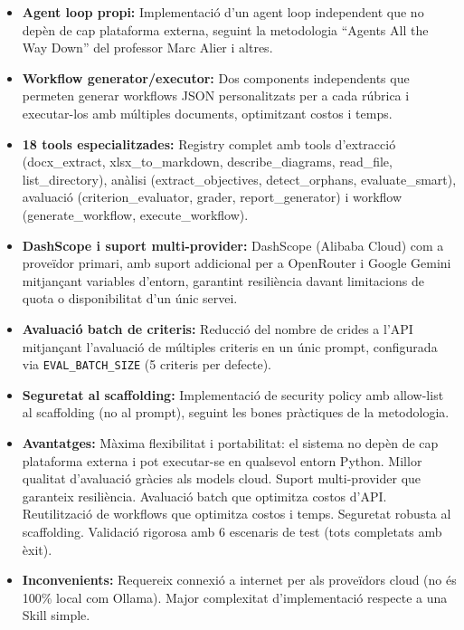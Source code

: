 \documentclass[12pt,a4paper,twoside]{report}
\begin{document}
\begin{itemize}
    \item \textbf{Agent loop propi:} Implementaci\'o d'un agent loop independent que no dep\`en de cap plataforma externa, seguint la metodologia ``Agents All the Way Down'' \cite{alier2025} del professor Marc Alier i altres.
    \item \textbf{Workflow generator/executor:} Dos components independents que permeten generar workflows JSON personalitzats per a cada r\'ubrica i executar-los amb m\'ultiples documents, optimitzant costos i temps.
    \item \textbf{18 tools especialitzades:} Registry complet amb tools d'extracci\'o (docx\_extract, xlsx\_to\_markdown, describe\_diagrams, read\_file, list\_directory), an\`alisi (extract\_objectives, detect\_orphans, evaluate\_smart), avaluaci\'o (criterion\_evaluator, grader, report\_generator) i workflow (generate\_workflow, execute\_workflow).
    \item \textbf{DashScope i suport multi-provider:} DashScope (Alibaba Cloud) com a prove\"idor primari, amb suport addicional per a OpenRouter i Google Gemini mitjan\c{c}ant variables d'entorn, garantint resili\`encia davant limitacions de quota o disponibilitat d'un \'unic servei.
    \item \textbf{Avaluaci\'o batch de criteris:} Reducci\'o del nombre de crides a l'API mitjan\c{c}ant l'avaluaci\'o de m\'ultiples criteris en un \'unic prompt, configurada via \texttt{EVAL\_BATCH\_SIZE} (5 criteris per defecte).
    \item \textbf{Seguretat al scaffolding:} Implementaci\'o de security policy amb allow-list al scaffolding (no al prompt), seguint les bones pr\`actiques de la metodologia.
\end{itemize}

\begin{itemize}
    \item \textbf{Avantatges:} M\`axima flexibilitat i portabilitat: el sistema no dep\`en de cap plataforma externa i pot executar-se en qualsevol entorn Python. Millor qualitat d'avaluaci\'o gr\`acies als models cloud. Suport multi-provider que garanteix resili\`encia. Avaluaci\'o batch que optimitza costos d'API. Reutilitzaci\'o de workflows que optimitza costos i temps. Seguretat robusta al scaffolding. Validaci\'o rigorosa amb 6 escenaris de test (tots completats amb \`exit).
    \item \textbf{Inconvenients:} Requereix connexi\'o a internet per als prove\"idors cloud (no \'es 100\% local com Ollama). Major complexitat d'implementaci\'o respecte a una Skill simple.
\end{itemize}
\end{document}
